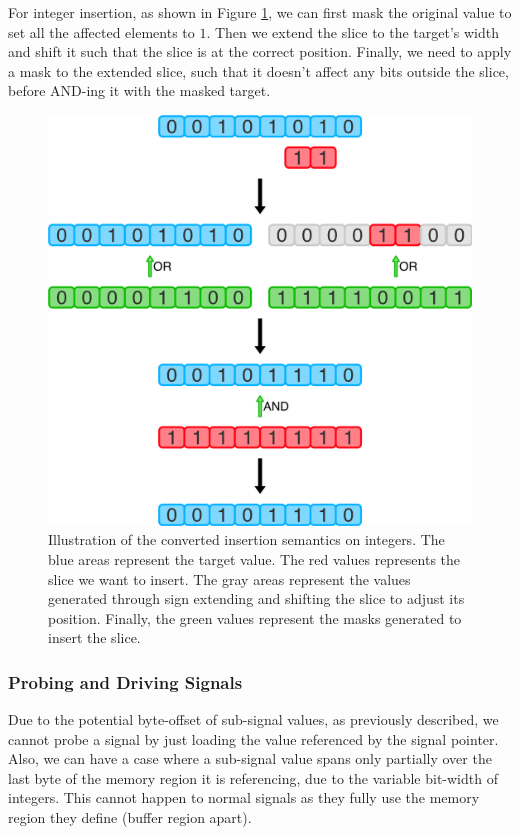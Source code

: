 For integer insertion, as shown in Figure \ref{fig:insert_int}, we can first mask the original value to set all the affected elements to $1$. Then we extend the slice to the target's width and shift it such that the slice is at the correct position. Finally, we need to apply a mask to the extended slice, such that it doesn't affect any bits outside the slice, before AND-ing it with the masked target.

\begin{figure}[ht]
    \includegraphics[width=\textwidth]{gfx/InsertInt.png}
    \caption[Illustration of the converted insertion semantics on integers.]{Illustration of the converted insertion semantics on integers. The blue areas represent the target value. The red values represents the slice we want to insert. The gray areas represent the values generated through sign extending and shifting the slice to adjust its position. Finally, the green values represent the masks generated to insert the slice.}
    \label{fig:insert_int}
\end{figure}


\subsubsection{Probing and Driving Signals}
Due to the potential byte-offset of sub-signal values, as previously described, we cannot probe a signal by just loading the value referenced by the signal pointer. Also, we can have a case where a sub-signal value spans only partially over the last byte of the memory region it is referencing, due to the variable bit-width of integers. This cannot happen to normal signals as they fully use the memory region they define (buffer region apart).

